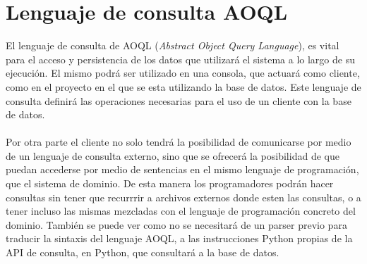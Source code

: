 \documentclass{melta}
\begin{document}
\section{Lenguaje de consulta AOQL}
\label{sec:aoql}
El lenguaje de consulta de AOQL (\textit{Abstract Object Query Language}), es vital para el acceso y persistencia de los datos que utilizará el sistema a lo largo de su ejecución. El mismo podrá ser utilizado en una consola, que actuará como cliente, como en el proyecto en el que se esta utilizando la base de datos. 
Este lenguaje de consulta definirá las operaciones necesarias para el uso de un cliente con la base de datos.
\\\\
Por otra parte el cliente no solo tendrá la posibilidad de comunicarse por medio de un lenguaje de consulta externo, sino que se ofrecerá la posibilidad de que puedan accederse por medio de sentencias en el mismo lenguaje de programación, que el sistema de dominio. De esta manera los programadores podrán hacer consultas sin tener que recurrrir a archivos externos donde esten las consultas, o a tener incluso las mismas mezcladas con el lenguaje de programación concreto del dominio. También se puede ver como no se necesitará de un parser previo para traducir la sintaxis del lenguaje AOQL, a las instrucciones Python propias de la API de consulta, en Python, que consultará a la base de datos.
\\\\
\label{table:gramatica}
\end{document}

